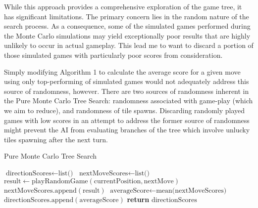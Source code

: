 \documentclass{article}
\begin{document}
While this approach provides a comprehensive exploration of the game tree, it has significant limitations. The primary concern lies in the random nature of the search process. As a consequence, some of the simulated games performed during the Monte Carlo simulations may yield exceptionally poor results that are highly unlikely to occur in actual gameplay.  This lead me to want to discard a portion of those simulated games with particularly poor scores from consideration.

Simply modifying Algorithm 1 to calculate the average score for a given move using only top-performing of simulated games would not adequately address this source of randomness, however.  There are two sources of randomness inherent in the Pure Monte Carlo Tree Search: randomness associated with game-play (which we aim to reduce), and randomness of tile spawns.  Discarding randomly played games with low scores in an attempt to address the former source of randomness might prevent the AI from evaluating branches of the tree which involve unlucky tiles spawning after the next turn.

\begin{algorithm}
\label{PMCTS_algo}
    \caption{Pure Monte Carlo Tree Search}
    \begin{algorithmic}[1]
            \State $\text{directionScores} \gets \text{list()}$
                \State $\text{nextMoveScores} \gets \text{list()}$
                    \State $\text{result} \gets \text{playRandomGame}(\text{currentPosition}, \text{nextMove})$
                    \State $\text{nextMoveScores}.\text{append}(\text{result})$
                \EndFor
                \State $\text{averageScore} \gets \text{mean(nextMoveScores)}$
                \State $\text{directionScores}.\text{append}(\text{averageScore})$
            \EndFor
            \State \textbf{return} $\text{directionScores}$
        \EndFunction
    \end{algorithmic}
\end{algorithm}
\end{document}
